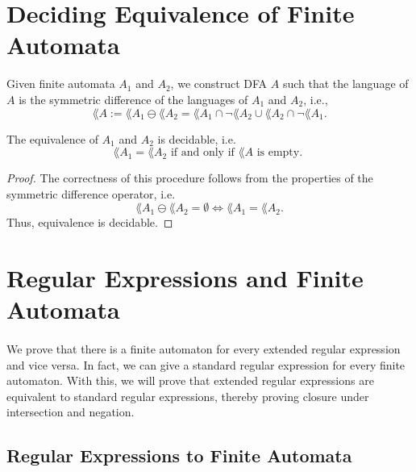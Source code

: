\section{Deciding Equivalence of Finite Automata}
Given finite automata $A_1$ and $A_2$, we construct DFA $A$ such that the language of $A$ is the symmetric difference of the languages of $A_1$ and $A_2$, i.e.,
\begin{equation*}          
    \lang{A} := \lang{A_1} \ominus \lang{A_2} = \lang{A_1} \cap \neg \lang{A_2} \cup \lang{A_2} \cap \neg \lang{A_1}.      
\end{equation*}
\begin{theorem} The equivalence of $A_1$ and $A_2$ is decidable, i.e.
    \label{dfa_sym_diff_correct}
    \begin{equation*}                
        \lang{A_1} = \lang{A_2} \mbox{ if and only if } \lang{A} \mbox{ is empty. }                
    \end{equation*}
\end{theorem}
\begin{proof}
    The correctness of this procedure follows from the properties of the symmetric difference operator, i.e.
    \begin{equation*}                  
        \lang{A_1} \ominus \lang{A_2} = \emptyset \Leftrightarrow \lang{A_1} = \lang{A_2}.                  
    \end{equation*}
    Thus, equivalence is decidable.    
\end{proof}


\section{Regular Expressions and Finite Automata}

\paragraph{} 
We prove that there is a finite automaton for every extended regular expression and vice versa. 
In fact, we can give a standard regular expression for every finite automaton.
With this, we will prove that extended regular expressions are equivalent to standard regular expressions, 
thereby proving closure under intersection and negation.


\subsection{Regular Expressions to Finite Automata}


